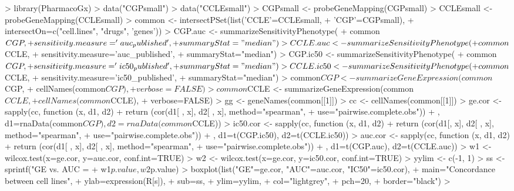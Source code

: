 \documentclass[11pt]{article}
\begin{document}
\begin{Schunk}
\begin{Sinput}
>   library(PharmacoGx)
>   data("CGPsmall")
>   data("CCLEsmall")
>   CGPsmall <- probeGeneMapping(CGPsmall) 
>   CCLEsmall <- probeGeneMapping(CCLEsmall) 
>   common <- intersectPSet(list('CCLE'=CCLEsmall,
+                                'CGP'=CGPsmall),
+                           intersectOn=c("cell.lines", "drugs", 'genes'))
>   CGP.auc <- summarizeSensitivityPhenotype(
+                 common$CGP, 
+                 sensitivity.measure='auc_published', 
+                 summaryStat="median")
>   CCLE.auc <- summarizeSensitivityPhenotype(
+                 common$CCLE, 
+                 sensitivity.measure='auc_published', 
+                 summaryStat="median")
>   CGP.ic50 <- summarizeSensitivityPhenotype(
+                 common$CGP, 
+                 sensitivity.measure='ic50_published', 
+                 summaryStat="median")
>   CCLE.ic50 <- summarizeSensitivityPhenotype(
+                 common$CCLE, 
+                 sensitivity.measure='ic50_published', 
+                 summaryStat="median")
>   common$CGP <- summarizeGeneExpression(common$CGP, 
+                                         cellNames(common$CGP),
+                                         verbose=FALSE)
>   common$CCLE <- summarizeGeneExpression(common$CCLE, 
+                                          cellNames(common$CCLE),
+                                          verbose=FALSE)
>   gg <- geneNames(common[[1]])
>   cc <- cellNames(common[[1]])
>   ge.cor <- sapply(cc, function (x, d1, d2) {
+     return (cor(d1[ , x], d2[ , x], method="spearman",
+                 use="pairwise.complete.obs"))
+   }, d1=rnaData(common$CGP), d2=rnaData(common$CCLE))
>   ic50.cor <- sapply(cc, function (x, d1, d2) {
+     return (cor(d1[, x], d2[ , x], method="spearman",
+                 use="pairwise.complete.obs"))
+   }, d1=t(CGP.ic50), d2=t(CCLE.ic50))
>   auc.cor <- sapply(cc, function (x, d1, d2) {
+     return (cor(d1[ , x], d2[ , x], method="spearman",
+                 use="pairwise.complete.obs"))
+   }, d1=t(CGP.auc), d2=t(CCLE.auc))
>   w1 <- wilcox.test(x=ge.cor, y=auc.cor, conf.int=TRUE)
>   w2 <- wilcox.test(x=ge.cor, y=ic50.cor, conf.int=TRUE)
>   yylim <- c(-1, 1)
>   ss <- sprintf("GE vs. AUC = %
+                 w1$p.value, w2$p.value)
>   boxplot(list("GE"=ge.cor, "AUC"=auc.cor, "IC50"=ic50.cor),
+           main="Concordance between cell lines",
+           ylab=expression(R[s]),
+           sub=ss,
+           ylim=yylim,
+           col="lightgrey",
+           pch=20,
+           border="black")
> 
\end{Sinput}
\end{Schunk}
\end{document}
